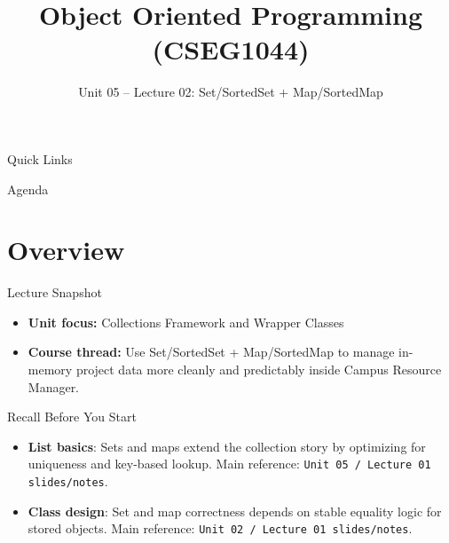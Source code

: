 \documentclass{beamer}
\title[OOPS with Java]{Object Oriented Programming (CSEG1044)}
\subtitle{Unit 05 -- Lecture 02: Set/SortedSet + Map/SortedMap}
\begin{document}
\begin{frame}[fragile]
  \titlepage
  \vspace{0.5em}
  \slidesources{\OOPSUnitVSources}
\end{frame}

\begin{frame}{Quick Links}
  \centering
  \hyperlink{sec:overview}{}\hspace{0.6em}
  \hyperlink{sec:concepts}{}\hspace{0.6em}
  \hyperlink{sec:demo}{}\hspace{0.6em}
  \hyperlink{sec:summary}{}
  \slidesources{\OOPSUnitVSources}
\end{frame}

\begin{frame}{Agenda}
  \tableofcontents
  \slidesources{\OOPSUnitVSources}
\end{frame}

\section{Overview}
\label{sec:overview}

\begin{frame}{Lecture Snapshot}
\begin{itemize}[<+->]
  \item \textbf{Unit focus:} Collections Framework and Wrapper Classes
  \item \textbf{Course thread:} Use Set/SortedSet + Map/SortedMap to manage in-memory project data more cleanly and predictably inside Campus Resource Manager.
\end{itemize}
  \slidesources{\OOPSUnitVSources}
\end{frame}

\begin{frame}{Recall Before You Start}
\begin{itemize}[<+->]
  \item \textbf{List basics}: Sets and maps extend the collection story by optimizing for uniqueness and key-based lookup. Main reference: \texttt{Unit 05 / Lecture 01 slides/notes}.
  \item \textbf{Class design}: Set and map correctness depends on stable equality logic for stored objects. Main reference: \texttt{Unit 02 / Lecture 01 slides/notes}.
\end{itemize}
  \slidesources{\OOPSUnitVSources}
\end{frame}
\end{document}
